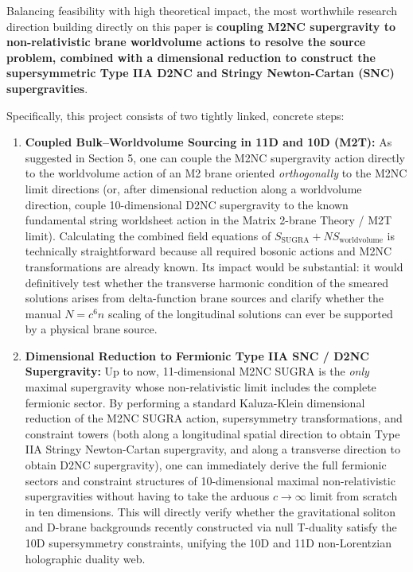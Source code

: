 \documentclass[11pt,a4paper]{article}
\begin{document}
Balancing feasibility with high theoretical impact, the most worthwhile research direction building directly on this paper is \textbf{coupling M2NC supergravity to non-relativistic brane worldvolume actions to resolve the source problem, combined with a dimensional reduction to construct the supersymmetric Type IIA D2NC and Stringy Newton-Cartan (SNC) supergravities}.

Specifically, this project consists of two tightly linked, concrete steps:
\begin{enumerate}
    \item \textbf{Coupled Bulk--Worldvolume Sourcing in 11D and 10D (M2T):} As suggested in Section 5, one can couple the M2NC supergravity action directly to the worldvolume action of an M2 brane oriented \emph{orthogonally} to the M2NC limit directions (or, after dimensional reduction along a worldvolume direction, couple 10-dimensional D2NC supergravity to the known fundamental string worldsheet action in the Matrix 2-brane Theory / M2T limit). Calculating the combined field equations of $S_{\text{SUGRA}} + N S_{\text{worldvolume}}$ is technically straightforward because all required bosonic actions and M2NC transformations are already known. Its impact would be substantial: it would definitively test whether the transverse harmonic condition of the smeared solutions arises from delta-function brane sources and clarify whether the manual $N = c^6 n$ scaling of the longitudinal solutions can ever be supported by a physical brane source.
    \item \textbf{Dimensional Reduction to Fermionic Type IIA SNC / D2NC Supergravity:} Up to now, 11-dimensional M2NC SUGRA is the \emph{only} maximal supergravity whose non-relativistic limit includes the complete fermionic sector. By performing a standard Kaluza-Klein dimensional reduction of the M2NC SUGRA action, supersymmetry transformations, and constraint towers (both along a longitudinal spatial direction to obtain Type IIA Stringy Newton-Cartan supergravity, and along a transverse direction to obtain D2NC supergravity), one can immediately derive the full fermionic sectors and constraint structures of 10-dimensional maximal non-relativistic supergravities without having to take the arduous $c \to \infty$ limit from scratch in ten dimensions. This will directly verify whether the gravitational soliton and D-brane backgrounds recently constructed via null T-duality satisfy the 10D supersymmetry constraints, unifying the 10D and 11D non-Lorentzian holographic duality web.
\end{enumerate}
\end{document}
